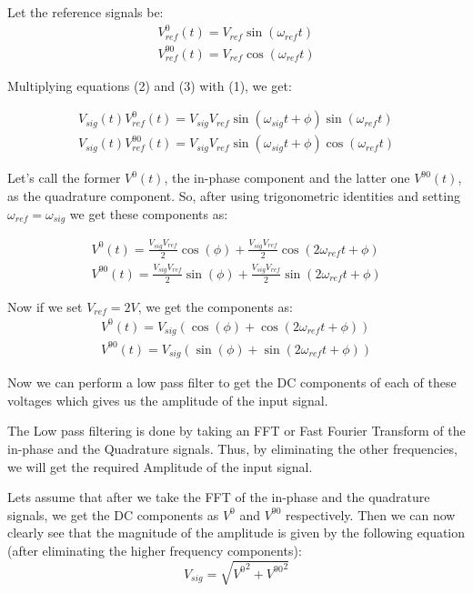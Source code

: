 \documentclass{article}
\begin{document}
\begin{multicols}{2}
Let the reference signals be:
\begin{eqnarray}
    V_{ref}^0(t) = V_{ref} \sin(\omega_{ref}t)\\
    V_{ref}^{90}(t) = V_{ref} \cos(\omega_{ref}t)
\end{eqnarray}

Multiplying equations (2) and (3) with (1), we get:

\begin{eqnarray}
    V_{sig}(t) V_{ref}^0(t) = V_{sig} V_{ref} \sin(\omega_{sig}t + \phi) \sin(\omega_{ref}t)\\
    V_{sig}(t) V_{ref}^{90}(t) = V_{sig} V_{ref} \sin(\omega_{sig}t + \phi) \cos(\omega_{ref}t)
\end{eqnarray}


Let's call the former $V^0(t)$, the in-phase component and the latter one $V^90 (t)$, as the quadrature component. So, after using trigonometric identities and setting $\omega_{ref} = \omega_{sig} $ we get these components as: 

\begin{eqnarray}
    V^0(t) = \frac{V_{sig} V_{ref}}{2} \cos(\phi) + \frac{V_{sig} V_{ref}}{2} \cos(2\omega_{ref}t + \phi)\\
    V^{90}(t) = \frac{V_{sig} V_{ref}}{2} \sin(\phi) + \frac{V_{sig} V_{ref}}{2} \sin(2\omega_{ref}t + \phi)
\end{eqnarray}

Now if we set $V_{ref} = 2V$, we get the components as:
\begin{eqnarray}
    V^0(t) = V_{sig} (\cos(\phi) +  \cos(2\omega_{ref}t + \phi))\\
    V^{90}(t) = V_{sig}(\sin(\phi) + \sin(2\omega_{ref}t + \phi))
\end{eqnarray}

Now we can perform a low pass filter to get the DC components of each of these voltages which gives us the amplitude of the input signal.

The Low pass filtering is done by taking an FFT or Fast Fourier Transform of the in-phase and the Quadrature signals. Thus, by eliminating the other frequencies, we will get the required Amplitude of the input signal. 

Lets assume that after we take the FFT of the in-phase and the quadrature signals, we get the DC components as $V^0$ and $V^{90}$ respectively. Then
we can now clearly see that the magnitude of the amplitude is given by the following equation (after eliminating the higher frequency components):
\begin{equation}
    V_{sig} = \sqrt{{V^0}^2 + {V^{90}}^2}
\end{equation}


\end{multicols}
\end{document}
